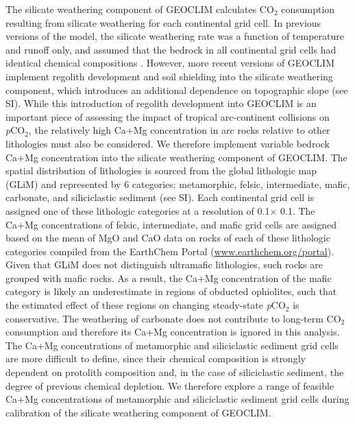 \documentclass[11pt,letterpaper]{article}
\newcommand{\degrees}{\textdegree\xspace}
\newcommand{\pCOtwo}{\textit{p}CO$_{2}$\xspace}
\newcommand{\COtwo}{CO$_{2}$\xspace}
\begin{document}
The silicate weathering component of GEOCLIM calculates \COtwo consumption resulting from silicate weathering for each continental grid cell. In previous versions of the model, the silicate weathering rate was a function of temperature and runoff only, and assumed that the bedrock in all continental grid cells had identical chemical compositions \cite{Godderis2014a}. However, more recent versions of GEOCLIM implement regolith development and soil shielding into the silicate weathering component, which introduces an additional dependence on topographic slope (see SI). While this introduction of regolith development into GEOCLIM is an important piece of assessing the impact of tropical arc-continent collisions on \pCOtwo, the relatively high Ca+Mg concentration in arc rocks relative to other lithologies must also be considered. We therefore implement variable bedrock Ca+Mg concentration into the silicate weathering component of GEOCLIM. The spatial distribution of lithologies is sourced from the global lithologic map (GLiM) \cite{Hartmann2012a} and represented by 6 categories: metamorphic, felsic, intermediate, mafic, carbonate, and siliciclastic sediment (see SI). Each continental grid cell is assigned one of these lithologic categories at a resolution of 0.1\degrees $\times$ 0.1\degrees. The Ca+Mg concentrations of felsic, intermediate, and mafic grid cells are assigned based on the mean of MgO and CaO data on rocks of each of these lithologic categories compiled from the EarthChem Portal (\url{www.earthchem.org/portal}). Given that GLiM does not distinguish ultramafic lithologies, such rocks are grouped with mafic rocks. As a result, the Ca+Mg concentration of the mafic category is likely an underestimate in regions of obducted ophiolites, such that the estimated effect of these regions on changing steady-state \pCOtwo is conservative. The weathering of carbonate does not contribute to long-term \COtwo consumption and therefore its Ca+Mg concentration is ignored in this analysis. The Ca+Mg concentrations of metamorphic and siliciclastic sediment grid cells are more difficult to define, since their chemical composition is strongly dependent on protolith composition and, in the case of siliciclastic sediment, the degree of previous chemical depletion. We therefore explore a range of feasible Ca+Mg concentrations of metamorphic and siliciclastic sediment grid cells during calibration of the silicate weathering component of GEOCLIM.
\end{document}
